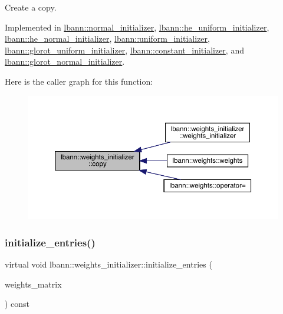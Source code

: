 Create a copy. 

Implemented in \hyperlink{classlbann_1_1normal__initializer_a154369b8513c5cf0edf201f1e8cc0887}{lbann\+::normal\+\_\+initializer}, \hyperlink{classlbann_1_1he__uniform__initializer_a9860575b43f3d08831d00219bb07ec73}{lbann\+::he\+\_\+uniform\+\_\+initializer}, \hyperlink{classlbann_1_1he__normal__initializer_af71916bbf87c6d34fb701c79fa6237bf}{lbann\+::he\+\_\+normal\+\_\+initializer}, \hyperlink{classlbann_1_1uniform__initializer_aeff019b94438eeb847d7236d5d28cdb3}{lbann\+::uniform\+\_\+initializer}, \hyperlink{classlbann_1_1glorot__uniform__initializer_a3c5790bf2e7b0e771d3ed1d93c8f255f}{lbann\+::glorot\+\_\+uniform\+\_\+initializer}, \hyperlink{classlbann_1_1constant__initializer_a1af9be89f528045f47abf13818d814ce}{lbann\+::constant\+\_\+initializer}, and \hyperlink{classlbann_1_1glorot__normal__initializer_a8d05bb2c3d56a5dc3ca4be2a62640470}{lbann\+::glorot\+\_\+normal\+\_\+initializer}.

Here is the caller graph for this function\+:\nopagebreak
\begin{figure}[H]
\begin{center}
\leavevmode
\includegraphics[width=350pt]{classlbann_1_1weights__initializer_acc84ce49188b74b23987cef3db18525a_icgraph}
\end{center}
\end{figure}
\mbox{\label{classlbann_1_1weights__initializer_a2ad6acf904c0c7bc7406dbd9851107be}} 
\subsubsection{\texorpdfstring{initialize\+\_\+entries()}{initialize\_entries()}}
{\footnotesize\ttfamily virtual void lbann\+::weights\+\_\+initializer\+::initialize\+\_\+entries (\begin{DoxyParamCaption}\item[{\hyperlink{base_8hpp_a9a697a504ae84010e7439ffec862b470}{Abs\+Dist\+Mat} \&}]{weights\+\_\+matrix }\end{DoxyParamCaption}) const\hspace{0.3cm}{\ttfamily [pure virtual]}}

